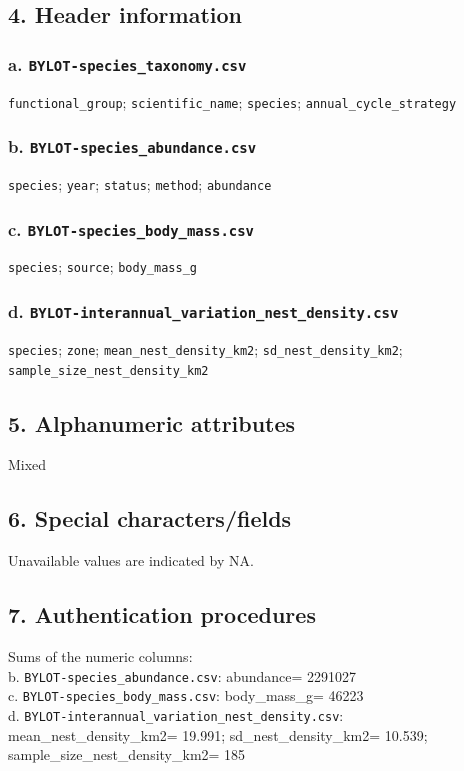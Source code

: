 \documentclass[a4paper,twoside,12pt]{article}
\begin{document}
        		\subsection*{4. Header information} 
        			\subsubsection*{a. \texttt{BYLOT-species\_taxonomy.csv}}
        			\texttt{functional\_group}; \texttt{scientific\_name}; \texttt{species}; \texttt{annual\_cycle\_strategy}
        			
        			\subsubsection*{b. \texttt{BYLOT-species\_abundance.csv}}
        			\texttt{species}; \texttt{year}; \texttt{status}; \texttt{method}; \texttt{abundance}
        			
        			\subsubsection*{c. \texttt{BYLOT-species\_body\_mass.csv}}
        			\texttt{species}; \texttt{source}; \texttt{body\_mass\_g}
        			
        			\subsubsection*{d. \texttt{BYLOT-interannual\_variation\_nest\_density.csv}}
        			\texttt{species}; \texttt{zone}; \texttt{mean\_nest\_density\_km2}; \texttt{sd\_nest\_density\_km2}; \texttt{sample\_size\_nest\_density\_km2}
        		
        		\subsection*{5. Alphanumeric attributes} Mixed
        		
        		\subsection*{6. Special characters/fields} Unavailable values are indicated by NA.
        		
        		\subsection*{7. Authentication procedures}
        		Sums of the numeric columns: \\
        		b. \texttt{BYLOT-species\_abundance.csv}: abundance= 2291027\\
        		c. \texttt{BYLOT-species\_body\_mass.csv}: body\_mass\_g= 46223\\
        		d. \texttt{BYLOT-interannual\_variation\_nest\_density.csv}: mean\_nest\_density\_km2= 19.991; sd\_nest\_density\_km2= 10.539; sample\_size\_nest\_density\_km2= 185
        		
\end{document}
